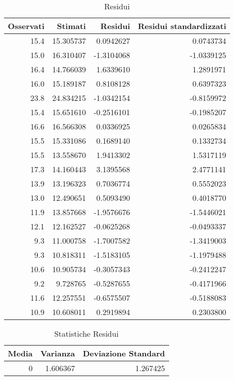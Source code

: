 \documentclass[]{book}
\begin{document}
\begin{table}

\caption{\label{tab:modello-lineare-multivariato-residui}Residui}
\centering
\begin{tabular}[t]{r|r|r|r}
\hline
Osservati & Stimati & Residui & Residui standardizzati\\
\hline
15.4 & 15.305737 & 0.0942627 & 0.0743734\\
\hline
15.0 & 16.310407 & -1.3104068 & -1.0339125\\
\hline
16.4 & 14.766039 & 1.6339610 & 1.2891971\\
\hline
16.0 & 15.189187 & 0.8108128 & 0.6397323\\
\hline
23.8 & 24.834215 & -1.0342154 & -0.8159972\\
\hline
15.4 & 15.651610 & -0.2516101 & -0.1985207\\
\hline
16.6 & 16.566308 & 0.0336925 & 0.0265834\\
\hline
15.5 & 15.331086 & 0.1689140 & 0.1332734\\
\hline
15.5 & 13.558670 & 1.9413302 & 1.5317119\\
\hline
17.3 & 14.160443 & 3.1395568 & 2.4771141\\
\hline
13.9 & 13.196323 & 0.7036774 & 0.5552023\\
\hline
13.0 & 12.490651 & 0.5093490 & 0.4018770\\
\hline
11.9 & 13.857668 & -1.9576676 & -1.5446021\\
\hline
12.1 & 12.162527 & -0.0625268 & -0.0493337\\
\hline
9.3 & 11.000758 & -1.7007582 & -1.3419003\\
\hline
9.3 & 10.818311 & -1.5183105 & -1.1979488\\
\hline
10.6 & 10.905734 & -0.3057343 & -0.2412247\\
\hline
9.2 & 9.728765 & -0.5287655 & -0.4171966\\
\hline
11.6 & 12.257551 & -0.6575507 & -0.5188083\\
\hline
10.9 & 10.608011 & 0.2919894 & 0.2303800\\
\hline
\end{tabular}
\end{table}

\begin{table}

\caption{\label{tab:modello-lineare-multivariato-statistiche}Statistiche Residui}
\centering
\begin{tabular}[t]{r|r|r}
\hline
Media & Varianza & Deviazione Standard\\
\hline
0 & 1.606367 & 1.267425\\
\hline
\end{tabular}
\end{table}
\end{document}
